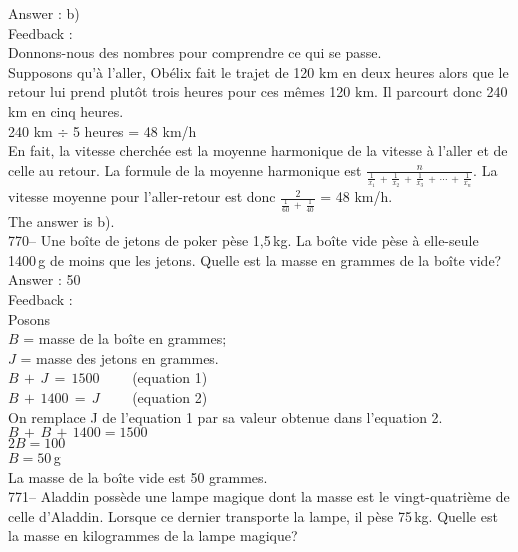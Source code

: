 \documentclass[letterpaper, 12pt]{article}
\begin{document}
Answer : b)\\

Feedback : \\
Donnons-nous des nombres pour comprendre ce qui se passe.  \\
Supposons qu'\`a l'aller, Ob\'elix fait le trajet de 120 km en deux heures
alors que le retour lui prend plut\^ot trois heures pour ces m\^emes 120 km.
Il parcourt donc 240 km en cinq heures.  \\
240 km $\div$ 5 heures = 48 km/h\\

En fait, la vitesse cherch\'ee est la moyenne harmonique de la vitesse \`a
l'aller et de celle au retour.  La formule de la moyenne harmonique est
$\frac{n}{\frac{1}{x_1}\,+\,\frac{1}{x_2}\,+\,\frac{1}{x_3}\,+\,\cdots\,+\,\frac{1}{x_n}}$.
La vitesse moyenne pour l'aller-retour est donc
$\frac{2}{\frac{1}{60}\,+\,\frac{1}{40}}$ = 48 km/h.\\
The answer is b).\\

770-- Une bo\^ite de jetons de poker p\`ese 1,5\,kg.  La bo\^ite vide p\`ese
\`a elle-seule 1400\,g de moins que les jetons.  Quelle est la masse en
grammes de la bo\^ite vide?\\

Answer : 50\\

Feedback : \\
Posons\\
$B$ = masse de la bo\^ite en grammes; \\
$J$ = masse des jetons en grammes. \\

$B\,+\,J\,=\,1500 \qquad$ (equation 1)\\
$B\,+\,1400\,=\,J \qquad$ (equation 2)\\

On remplace J de l'equation 1 par sa valeur obtenue dans l'equation 2.
\\
$B\,+\,B\,+\,1400=1500$\\
$2B=100$\\
$B=50$\,g\\
La masse de la bo\^ite vide est 50 grammes.\\

771-- Aladdin poss\`ede une lampe magique dont la masse est le
vingt-quatri\`eme de celle d'Aladdin.  Lorsque ce dernier transporte la
lampe, il p\`ese 75\,kg.  Quelle est la masse en kilogrammes de la lampe
magique?\\
\end{document}
